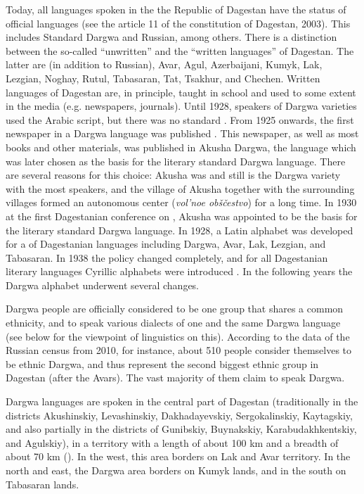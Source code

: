 Today, all languages spoken in the the Republic of Dagestan have the status of official languages (see the article 11 of the constitution of Dagestan, 2003). This includes Standard Dargwa and Russian, among others. There is a distinction between the so-called ``unwritten'' and the ``written languages'' of Dagestan. The latter are (in addition to Russian), Avar, Agul, Azerbaijani, Kumyk, Lak, Lezgian, Noghay, Rutul, Tabasaran, Tat, Tsakhur, and Chechen. Written languages of Dagestan are, in principle, taught in school and used to some extent in the media (e.g. newspapers, journals). Until 1928, speakers of Dargwa varieties used the Arabic script, but there was no standard . From 1925 onwards, the first newspaper in a Dargwa language was published \citep[15]{Abdullaev1954}. This newspaper, as well as most books and other materials, was published in Akusha Dargwa, the language which was later chosen as the basis for the literary standard Dargwa language. There are several reasons for this choice: Akusha was and still is the Dargwa variety with the most speakers, and the village of Akusha together with the surrounding villages formed an autonomous center (\textit{vol'noe obščestvo}) for a long time. In 1930 at the first Dagestanian conference on , Akusha was appointed to be the basis for the literary standard Dargwa language. In 1928, a Latin alphabet was developed for a  of Dagestanian languages including Dargwa, Avar, Lak, Lezgian, and Tabasaran. In 1938 the policy changed completely, and for all Dagestanian literary languages Cyrillic alphabets were introduced \citep[48]{Grenoble2003}. In the following years the Dargwa alphabet underwent several changes.

Dargwa people are officially considered to be one group that shares a common ethnicity, and to speak various dialects of one and the same Dargwa language (see below for the viewpoint of linguistics on this). According to the data of the Russian census from 2010, for instance, about 510 people consider themselves to be ethnic Dargwa, and thus represent the second biggest ethnic group in Dagestan (after the Avars). The vast majority of them claim to speak Dargwa.\largerpage

Dargwa languages are spoken in the central part of Dagestan (traditionally in the districts Akushinskiy, Levashinskiy, Dakhadayevskiy, Sergokalinskiy, Kaytagskiy, and also partially in the districts of Gunibskiy, Buynakskiy, Karabudakhkentskiy, and Agulskiy), in a territory with a length of about 100 km and a breadth of about 70 km (). In the west, this area borders on Lak and Avar territory. In the north and east, the Dargwa area borders on Kumyk lands, and in the south on Tabasaran lands.


